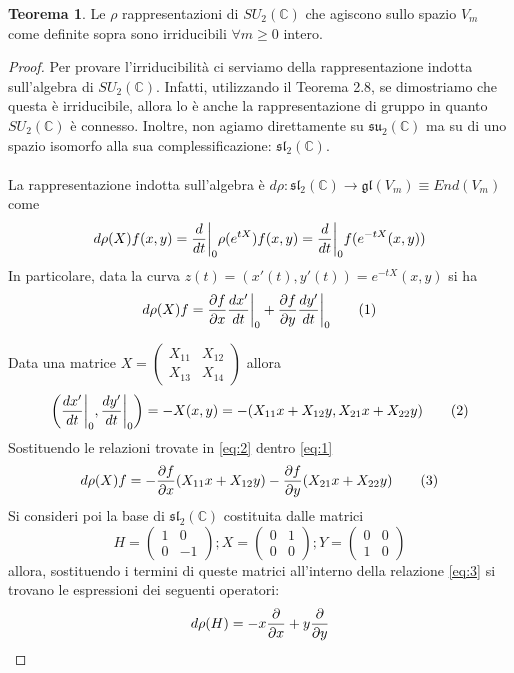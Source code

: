 \documentclass[12pt,a4paper]{report}
\theoremstyle{definition}
\newtheorem{Theo}[Def]{Teorema}
\theoremstyle{definition}
\theoremstyle{definition}
\theoremstyle{remark}
\begin{document}
\begin{Theo} \label{Theo1}
	Le $\rho$ rappresentazioni di $SU_2(\mathbb{C})$ che agiscono sullo spazio $V_m$ come definite sopra sono irriducibili $\forall m\geq 0$ intero.
\end{Theo}
\begin{proof}
	Per provare l'irriducibilità ci serviamo della rappresentazione indotta sull'algebra di $SU_2(\mathbb{C})$. Infatti, utilizzando il Teorema 2.8, se dimostriamo che questa è irriducibile, allora lo è anche la rappresentazione di gruppo in quanto $SU_2(\mathbb{C})$ è connesso. Inoltre, non agiamo direttamente su $\mathfrak{su_2(\mathbb{C})}$ ma su di uno spazio isomorfo alla sua complessificazione: $\mathfrak{sl_2(\mathbb{C})}$.\\
	\\
	La rappresentazione indotta sull'algebra è $d\rho:\mathfrak{sl_2(\mathbb{C})}\rightarrow \mathfrak{gl}(V_m)\equiv End(V_m)$ come 
	$$d\rho(X)f(x,y)={d\over dt}\bigg{\rvert}_{0}\rho(e^{tX})f(x,y)={d\over dt}\bigg{\rvert}_{0}f(e^{-tX}(x,y))$$
	In particolare, data la curva $z(t)=(x'(t),y'(t))=e^{-tX}(x,y)$ si ha 
	\begin{equation}
		d\rho(X)f={\partial f\over \partial x}{dx'\over dt}\bigg{\rvert}_0+{\partial f\over \partial y}{dy'\over dt}\bigg{\rvert}_0 \label{eq:1} \tag{1}
	\end{equation}
	
	Data una matrice  
	$X=\begin{pmatrix}
		X_{11}&X_{12}\\
		X_{13}&X_{14}
	\end{pmatrix}$ allora 
\begin{equation}
	\bigg{(}{dx'\over dt}\bigg{\rvert}_0,{dy'\over dt}\bigg{\rvert}_0\bigg{)}=-X(x,y)=-(X_{11}x+X_{12}y,X_{21}x+X_{22}y)\label{eq:2} \tag{2}
\end{equation}
Sostituendo le relazioni trovate in \ref{eq:2} dentro \ref{eq:1}
\begin{equation}
d\rho(X)f=-{\partial f\over \partial x}(X_{11}x+X_{12}y)-{\partial f\over \partial y}(X_{21}x+X_{22}y) \label{eq:3} \tag{3}
\end{equation}
	Si consideri poi la base di $\mathfrak{sl_2(\mathbb{C})}$ costituita dalle matrici $$H=
	\begin{pmatrix}
		1&0\\
		0&-1
	\end{pmatrix}; 
	X=\begin{pmatrix}
		0&1\\
		0&0
	\end{pmatrix};
	Y=\begin{pmatrix}
		0&0\\
		1&0
	\end{pmatrix}$$ allora, sostituendo i termini di queste matrici all'interno della relazione \ref{eq:3} si trovano le espressioni dei seguenti operatori:
\begin{equation*}
	d\rho(H)=-x{\partial\over\partial x}+y{\partial\over\partial y}
\end{equation*}


\end{proof}
\end{document}
